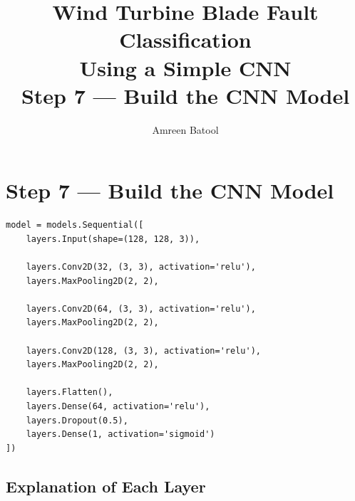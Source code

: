 \documentclass[12pt]{article}
\title{\textbf{Wind Turbine Blade Fault Classification\\Using a Simple CNN}\\[0.5em]
\large Step 7 --- Build the CNN Model}
\author{Amreen Batool}
\date{}
\begin{document}
\maketitle

\section*{Step 7 --- Build the CNN Model}

\begin{lstlisting}[style=pythonstyle]
model = models.Sequential([
    layers.Input(shape=(128, 128, 3)),

    layers.Conv2D(32, (3, 3), activation='relu'),
    layers.MaxPooling2D(2, 2),

    layers.Conv2D(64, (3, 3), activation='relu'),
    layers.MaxPooling2D(2, 2),

    layers.Conv2D(128, (3, 3), activation='relu'),
    layers.MaxPooling2D(2, 2),

    layers.Flatten(),
    layers.Dense(64, activation='relu'),
    layers.Dropout(0.5),
    layers.Dense(1, activation='sigmoid')
])
\end{lstlisting}

\subsection*{Explanation of Each Layer}
\end{document}
